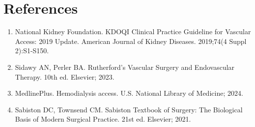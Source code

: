 \section*{References}
\begin{enumerate}
  \item National Kidney Foundation. KDOQI Clinical Practice Guideline for Vascular Access: 2019 Update. American Journal of Kidney Diseases. 2019;74(4 Suppl 2):S1-S150.
  
  \item Sidawy AN, Perler BA. Rutherford's Vascular Surgery and Endovascular Therapy. 10th ed. Elsevier; 2023.
  
  \item MedlinePlus. Hemodialysis access. U.S. National Library of Medicine; 2024.
  
  \item Sabiston DC, Townsend CM. Sabiston Textbook of Surgery: The Biological Basis of Modern Surgical Practice. 21st ed. Elsevier; 2021.
\end{enumerate}

\clearpage
